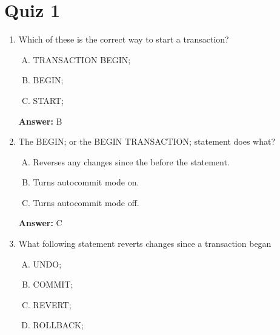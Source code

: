 \documentclass[12pt]{article}
\begin{document}
\bigskip

\section{Quiz 1}

\bigskip

\begin{enumerate}[1.]
    \item

    Which of these is the correct way to start a transaction?

    \bigskip

    \begin{enumerate}[A.]
        \item TRANSACTION BEGIN;
        \item BEGIN;
        \item START;
    \end{enumerate}

    \bigskip

    \textbf{Answer:} B

    \item

    The BEGIN; or the BEGIN TRANSACTION; statement does what?

    \bigskip

    \begin{enumerate}[A.]
        \item Reverses any changes since the before the statement.
        \item Turns autocommit mode on.
        \item Turns autocommit mode off.
    \end{enumerate}

    \bigskip

    \textbf{Answer:} C

    \item

    What following statement reverts changes since a transaction began

    \bigskip

    \begin{enumerate}[A.]
        \item UNDO;
        \item COMMIT;
        \item REVERT;
        \item ROLLBACK;
    \end{enumerate}

    \bigskip


\end{enumerate}
\end{document}
